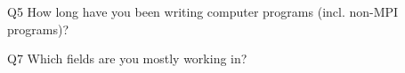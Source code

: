 \begin{description}%
\item{Q5} How long have you been writing computer programs (incl. non-MPI programs)?%
\item{Q7} Which fields are you mostly working in?%
\end{description}%

